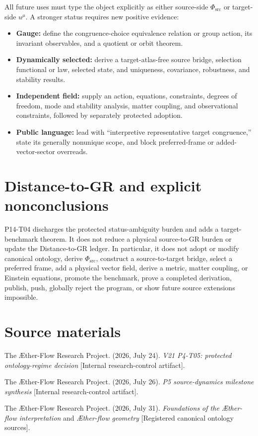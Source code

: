 \documentclass[11pt]{article}
\newcommand{\PhiSrc}{\Phi_{\mathrm{src}}}
\begin{document}
All future uses must type the object explicitly as either source-side
$\PhiSrc$ or target-side $u^\mu$.  A stronger status requires new positive
evidence:
\begin{itemize}
  \item \textbf{Gauge:} define the congruence-choice equivalence relation or
  group action, its invariant observables, and a quotient or orbit theorem.
  \item \textbf{Dynamically selected:} derive a target-atlas-free source
  bridge, selection functional or law, selected state, and uniqueness,
  covariance, robustness, and stability results.
  \item \textbf{Independent field:} supply an action, equations, constraints,
  degrees of freedom, mode and stability analysis, matter coupling, and
  observational constraints, followed by separately protected adoption.
  \item \textbf{Public language:} lead with ``interpretive representative
  target congruence,'' state its generally nonunique scope, and block
  preferred-frame or added-vector-sector overreads.
\end{itemize}

\section{Distance-to-GR and explicit nonconclusions}

P14-T04 discharges the protected status-ambiguity burden and adds a
target-benchmark theorem.  It does not reduce a physical source-to-GR burden
or update the Distance-to-GR ledger.  In particular, it does not adopt or
modify canonical ontology, derive $\PhiSrc$, construct a source-to-target
bridge, select a preferred frame, add a physical vector field, derive a
metric, matter coupling, or Einstein equations, promote the benchmark, prove
a completed derivation, publish, push, globally reject the program, or show
future source extensions impossible.

\section{Source materials}

The \AE ther-Flow Research Project. (2026, July 24). \emph{V21 P4-T05:
protected ontology-regime decision} [Internal research-control artifact].

The \AE ther-Flow Research Project. (2026, July 26). \emph{P5 source-dynamics
milestone synthesis} [Internal research-control artifact].

The \AE ther-Flow Research Project. (2026, July 31). \emph{Foundations of the
\AE ther-flow interpretation} and \emph{\AE ther-flow geometry} [Registered
canonical ontology sources].
\end{document}
